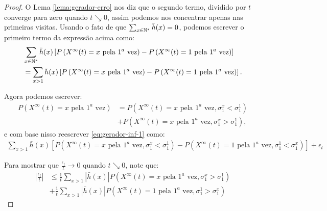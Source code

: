 \begin{proof}
  O Lema \ref{lema:gerador-erro} nos diz que o segundo termo, dividido
  por $t$ converge para zero quando $t \searrow 0$, assim podemos nos
  concentrar apenas nas primeiras visitas. Usando o fato de que
  $\sum_{x\in{\mathbb{N^*}}}\bar{h}(x) = 0$, podemos escrever o primeiro termo da
  expressão acima como:
  \begin{align}
    \notag
    & \sum_{x \in {\mathbb{N^*}}} \bar{h}(x) \left[
      P\left( X^\infty(t) = x \text{ pela } 1^a \text{ vez} \right) - 
      P\left( X^\infty(t) = 1 \text{ pela } 1^a \text{ vez} \right)
    \right] \\
    \label{eq:gerador-inf-1}
    &= \sum_{x > 1} \bar{h}(x) \left[
      P\left( X^\infty(t) = x \text{ pela } 1^a \text{ vez} \right) - 
      P\left( X^\infty(t) = 1 \text{ pela } 1^a \text{ vez} \right)
    \right].
  \end{align}
  

  Agora podemos escrever:
  \begin{align*}
    P\left( X^\infty(t) = x \text{ pela } 1^a \text{ vez} \right) &=
    P\left(
      X^\infty(t) = x \text{ pela } 1^a \text{ vez},
      \sigma^x_1 < \sigma^1_1
    \right) \\ &+
    P\left(
      X^\infty(t) = x \text{ pela } 1^a \text{ vez},
      \sigma^x_1 > \sigma^1_1
    \right),
  \end{align*}
  e com base nisso reescrever \eqref{eq:gerador-inf-1} como:
  \begin{gather}
    \label{eq:gerador-inf-2}
    \sum_{x > 1} \bar{h}(x) \left[
      P\left(
        X^\infty(t) = x \text{ pela } 1^a \text{ vez},
        \sigma^x_1 < \sigma^1_1
      \right) - 
      P\left(
        X^\infty(t) = 1 \text{ pela } 1^a \text{ vez},
        \sigma^1_1 < \sigma^x_1
      \right)
    \right]
    + \epsilon_t
  \end{gather}

  Para mostrar que $\frac{\epsilon_t}{t} \to 0$ quando $t
  \searrow 0$, note que:
  \begin{align}
    \left| \frac{\epsilon_t}{t} \right|
    \label{eq:gerador-inf-visita-1-antes}
    & \leq  \frac{1}{t} \sum_{x > 1}|\bar{h}(x)|
    P\left(
      X^\infty(t) = x \text{ pela } 1^a \text{ vez},
      \sigma^x_1 > \sigma^1_1
    \right)\\
    \label{eq:gerador-inf-visita-x-antes}    
    &+ \frac{1}{t} \sum_{x > 1}|\bar{h}(x)|
    P\left(
      X^\infty(t) = 1 \text{ pela } 1^a \text{ vez},
      \sigma^1_1 > \sigma^x_1
    \right)
  \end{align}


\end{proof}
